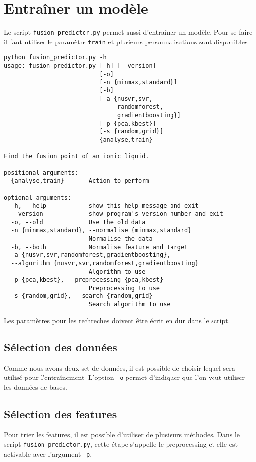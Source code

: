 \section{Entraîner un modèle}
Le script \texttt{fusion\_predictor.py} permet aussi d'entraîner un modèle.
Pour se faire il faut utiliser le paramètre \texttt{train} et plusieurs personnalisations sont disponibles
\begin{lstlisting}
python fusion_predictor.py -h
usage: fusion_predictor.py [-h] [--version]
                           [-o]
                           [-n {minmax,standard}]
                           [-b]
                           [-a {nusvr,svr,
                                randomforest,
                                gradientboosting}]
                           [-p {pca,kbest}]
                           [-s {random,grid}]
                           {analyse,train}

Find the fusion point of an ionic liquid.

positional arguments:
  {analyse,train}       Action to perform

optional arguments:
  -h, --help            show this help message and exit
  --version             show program's version number and exit
  -o, --old             Use the old data
  -n {minmax,standard}, --normalise {minmax,standard}
                        Normalise the data
  -b, --both            Normalise feature and target
  -a {nusvr,svr,randomforest,gradientboosting},
  --algorithm {nusvr,svr,randomforest,gradientboosting}
                        Algorithm to use
  -p {pca,kbest}, --preprocessing {pca,kbest}
                        Preprocessing to use
  -s {random,grid}, --search {random,grid}
                        Search algorithm to use
\end{lstlisting}

Les paramètres pour les rechreches doivent être écrit en dur dans le script.

\subsection{Sélection des données}
Comme nous avons deux set de données, il est possible de choisir lequel sera utilisé pour l'entraînement.
L'option \texttt{-o} permet d'indiquer que l'on veut utiliser les données de bases.


\subsection{Sélection des features}
Pour trier les features, il est possible d'utiliser de plusieurs méthodes.
Dans le script \texttt{fusion\_predictor.py}, cette étape s'appelle le preprocessing et elle est activable avec l'argument \texttt{-p}.


